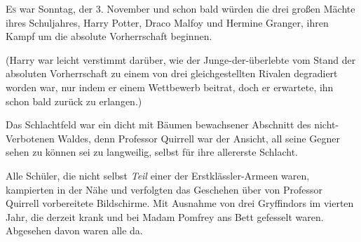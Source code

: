 

\lettrine{E}{s} war Sonntag, der 3. November und schon bald würden die drei großen Mächte ihres Schuljahres, Harry Potter, Draco Malfoy und Hermine Granger, ihren Kampf um die absolute Vorherrschaft beginnen.

(Harry war leicht verstimmt darüber, wie der Junge-der-überlebte vom Stand der absoluten Vorherrschaft zu einem von drei gleichgestellten Rivalen degradiert worden war, nur indem er einem Wettbewerb beitrat, doch er erwartete, ihn schon bald zurück zu erlangen.)

Das Schlachtfeld war ein dicht mit Bäumen bewachsener Abschnitt des nicht-Verbotenen Waldes, denn Professor Quirrell war der Ansicht, all seine Gegner sehen zu können sei zu langweilig, selbst für ihre allererste Schlacht.

Alle Schüler, die nicht selbst \emph{Teil} einer der Erstklässler-Armeen waren, kampierten in der Nähe und verfolgten das Geschehen über von Professor Quirrell vorbereitete Bildschirme. Mit Ausnahme von drei Gryffindors im vierten Jahr, die derzeit krank und bei Madam Pomfrey ans Bett gefesselt waren. Abgesehen davon waren alle da.

